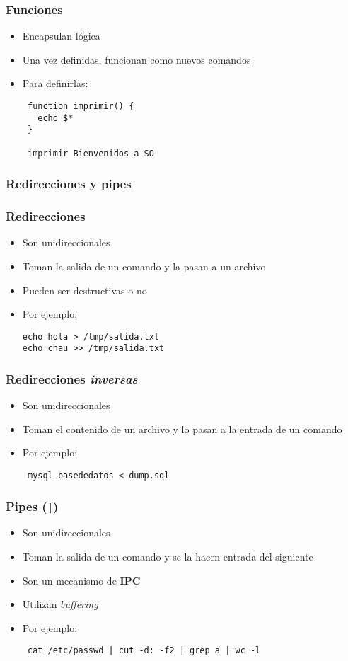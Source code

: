 \begin{frame}[fragile]
  \frametitle{Funciones}
  \begin{itemize}
    \item Encapsulan lógica
    \item Una vez definidas, funcionan como nuevos comandos
    \item Para definirlas:
   \begin{lstlisting}
 function imprimir() {
   echo $*
 }

 imprimir Bienvenidos a SO
   \end{lstlisting}
  \end{itemize}
\end{frame}

\subsubsection{Redirecciones y pipes}

\begin{frame}[fragile]
  \frametitle{Redirecciones}
  \begin{itemize}
    \item Son unidireccionales
    \item Toman la salida de un comando y la pasan a un archivo
    \item Pueden ser destructivas o no
    \item Por ejemplo:
   \begin{lstlisting}
echo hola > /tmp/salida.txt
echo chau >> /tmp/salida.txt
   \end{lstlisting}
  \end{itemize}
\end{frame}

\begin{frame}[fragile]
  \frametitle{Redirecciones \textit{inversas}}
  \begin{itemize}
    \item Son unidireccionales
    \item Toman el contenido de un archivo y lo pasan a la entrada de un comando
    \item Por ejemplo:
   \begin{lstlisting}
 mysql basededatos < dump.sql
   \end{lstlisting}
  \end{itemize}
\end{frame}

\begin{frame}[fragile]
  \frametitle{Pipes (\texttt{|})}
  \begin{itemize}
    \item Son unidireccionales
    \item Toman la salida de un comando y se la hacen entrada del siguiente
    \item Son un mecanismo de \textbf{IPC}
    \item Utilizan \textit{buffering}
    \item Por ejemplo:
   \begin{lstlisting}
 cat /etc/passwd | cut -d: -f2 | grep a | wc -l
   \end{lstlisting}
  \end{itemize}
\end{frame}

